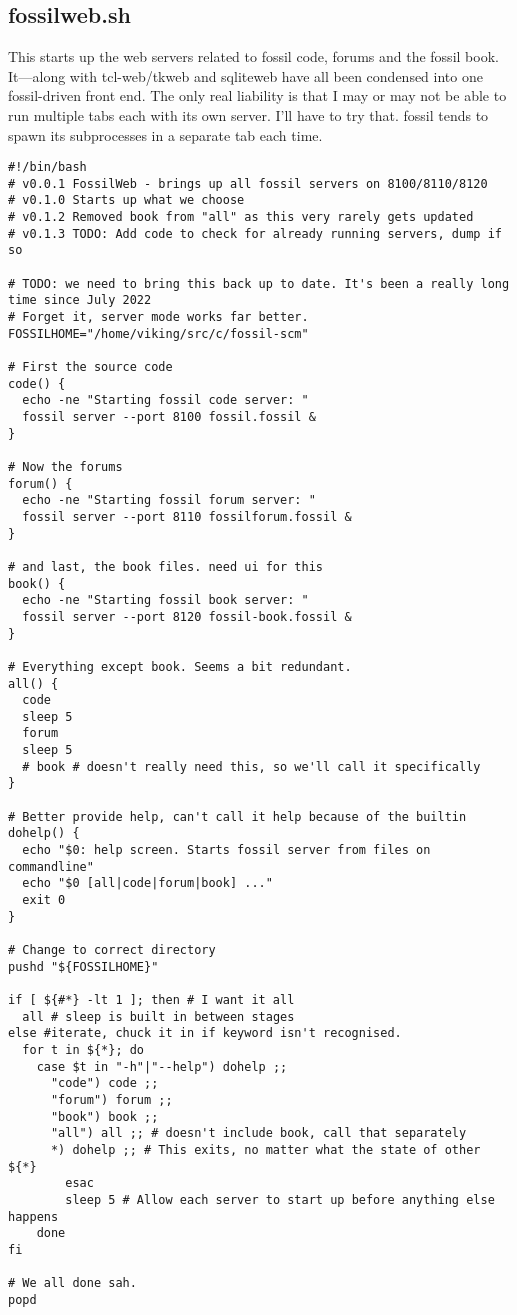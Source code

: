 \documentclass[11pt]{article}
\begin{document}
\subsection*{fossilweb.sh}
\label{sec:org35c6b36}
This starts up the web servers related to fossil code, forums and the fossil book. It—along with tcl-web/tkweb and sqliteweb have all been condensed into one fossil-driven front end. The only real liability is that I may or may not be able to run multiple tabs each with its own server. I'll have to try that. fossil tends to spawn its subprocesses in a separate tab each time.
\begin{verbatim}
#!/bin/bash
# v0.0.1 FossilWeb - brings up all fossil servers on 8100/8110/8120
# v0.1.0 Starts up what we choose
# v0.1.2 Removed book from "all" as this very rarely gets updated
# v0.1.3 TODO: Add code to check for already running servers, dump if so

# TODO: we need to bring this back up to date. It's been a really long time since July 2022
# Forget it, server mode works far better.
FOSSILHOME="/home/viking/src/c/fossil-scm"

# First the source code
code() {
  echo -ne "Starting fossil code server: "
  fossil server --port 8100 fossil.fossil &
}

# Now the forums
forum() {
  echo -ne "Starting fossil forum server: "
  fossil server --port 8110 fossilforum.fossil &
}

# and last, the book files. need ui for this
book() {
  echo -ne "Starting fossil book server: "
  fossil server --port 8120 fossil-book.fossil &
}

# Everything except book. Seems a bit redundant.
all() {
  code
  sleep 5
  forum
  sleep 5
  # book # doesn't really need this, so we'll call it specifically
}

# Better provide help, can't call it help because of the builtin
dohelp() {
  echo "$0: help screen. Starts fossil server from files on commandline"
  echo "$0 [all|code|forum|book] ..."
  exit 0
}

# Change to correct directory
pushd "${FOSSILHOME}"

if [ ${#*} -lt 1 ]; then # I want it all
  all # sleep is built in between stages
else #iterate, chuck it in if keyword isn't recognised.
  for t in ${*}; do
    case $t in "-h"|"--help") dohelp ;;
      "code") code ;;
      "forum") forum ;;
      "book") book ;;
      "all") all ;; # doesn't include book, call that separately
      *) dohelp ;; # This exits, no matter what the state of other ${*}
		esac
		sleep 5 # Allow each server to start up before anything else happens
	done
fi

# We all done sah.
popd

\end{verbatim}
\end{document}
